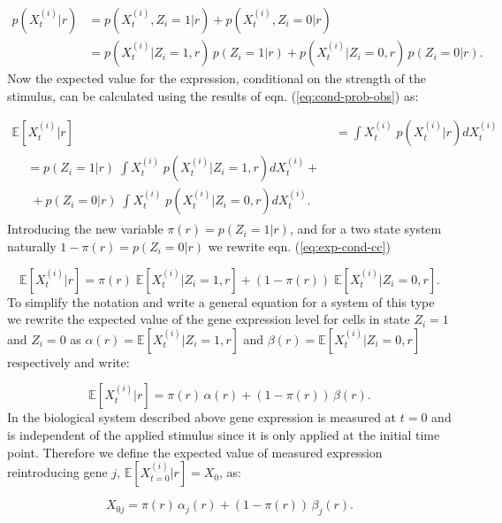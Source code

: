 \begin{align}
  p(X_{t}^{(i)} | r) &= p(X_{t}^{(i)}, Z_i =1 | r) + p(X_{t}^{(i)}, Z_i =0 | r)\\
  &= p(X_{t}^{(i)}| Z_i =1,  r) \, p(Z_i =1 | r) + p(X_{t}^{(i)}| Z_i =0,  r) \, p(Z_i =0 | r).
  \label{eq:cond-prob-obs}
\end{align}
Now the expected value for the expression, conditional on the strength of the stimulus, can be calculated using the results of eqn. (\ref{eq:cond-prob-obs}) as:

\begin{align}
  \mathbb{E} [X_t^{(i)} | r] &= \int X_t^{(i)} \; p(X_t^{(i)}| r) dX_t^{(i)} \\
  \begin{split}
    &= p(Z_i = 1| r)\; \int X_t^{(i)} \; p(X_t^{(i)}|Z_i = 1, r) dX_t^{(i)} + \label{eq:exp-cond-cc} \\
    & \; + p(Z_i = 0| r)\; \int X_t^{(i)} \; p(X_t^{(i)}|Z_i = 0, r) dX_t^{(i)}.
  \end{split}
\end{align}
Introducing the new variable $\pi(r) = p(Z_i = 1 | r)$, and for a two state system naturally  $1 - \pi(r) = p(Z_i = 0 | r)$ we rewrite eqn. (\ref{eq:exp-cond-cc})

\begin{equation}
  \mathbb{E} [X_t^{(i)} | r] = \pi(r)\; \mathbb{E} [X_t^{(i)} | Z_i =1, r] + \left( 1 - \pi(r) \right)\; \mathbb{E} [X_t^{(i)} | Z_i =0, r].
\end{equation}
To simplify the notation and write a general equation for a system of this type we rewrite the expected value of the gene expression level for cells in state $Z_i = 1$ and $Z_i = 0$ as $\alpha(r) = \mathbb{E} [X_t^{(i)} | Z_i =1, r]$ and  $\beta(r) =  \mathbb{E} [X_t^{(i)} | Z_i = 0, r]$ respectively and write:

\begin{equation}
  \label{eq:general-cc}
  \mathbb{E} [X_t^{(i)} | r] = \pi(r) \, \alpha(r) + \left( 1 - \pi(r) \right) \, \beta(r).
\end{equation}
In the biological system described above gene expression is measured at $t=0$ and is independent of the applied stimulus since it is only applied at the initial time point. Therefore we define the expected value of measured expression reintroducing gene $j$,  $\mathbb{E}[X_{t=0}^{(i)} | r] = X_0 $, as:

\begin{equation}
  \label{eq:init-cc}
  X_{0j} = \pi(r) \, \alpha_j(r) + \left( 1 - \pi(r) \right) \, \beta_j(r).
\end{equation}

